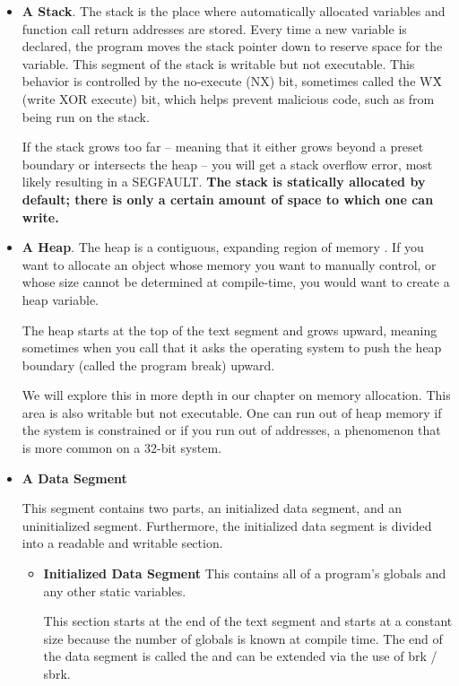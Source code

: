 \begin{itemize}
\item \textbf{A Stack}.
The stack is the place where automatically allocated variables and function call return addresses are stored.
Every time a new variable is declared, the program moves the stack pointer down to reserve space for the variable.
This segment of the stack is writable but not executable.
This behavior is controlled by the no-execute (NX) bit, sometimes called the W\^X (write XOR execute) bit, which helps prevent malicious code, such as  from being run on the stack.

If the stack grows too far -- meaning that it either grows beyond a preset boundary or intersects the heap -- you will get a stack overflow error, most likely resulting in a SEGFAULT.
\textbf{The stack is statically allocated by default; there is only a certain amount of space to which one can write.}

\item \textbf{A Heap}.
The heap is a contiguous, expanding region of memory \cite{mallocinternals}.
If you want to allocate an object whose memory you want to manually control, or whose size cannot be determined at compile-time, you would want to create a heap variable.

The heap starts at the top of the text segment and grows upward, meaning sometimes when you call  that it asks the operating system to push the heap boundary (called the program break) upward.

We will explore this in more depth in our chapter on memory allocation.
This area is also writable but not executable.
One can run out of heap memory if the system is constrained or if you run out of addresses, a phenomenon that is more common on a 32-bit system.

\item \textbf{A Data Segment}

  This segment contains two parts, an initialized data segment, and an uninitialized segment.
  Furthermore, the initialized data segment is divided into a readable and writable section.

\begin{itemize}
    \item \textbf{Initialized Data Segment}
          This contains all of a program's globals and any other static variables.

          This section starts at the end of the text segment and starts at a constant size because the number of globals is known at compile time. The end of the data segment is called the  and can be extended via the use of brk / sbrk.


\end{itemize}
\end{itemize}
